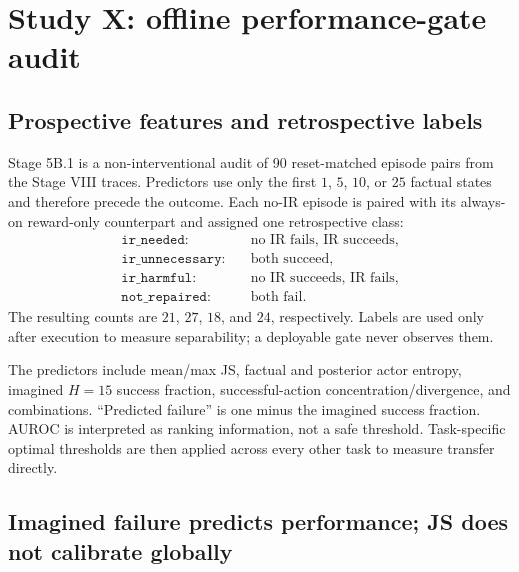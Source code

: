 \documentclass[10pt]{article}
\begin{document}
\section{Study X: offline performance-gate audit}

\subsection{Prospective features and retrospective labels}

Stage 5B.1 is a non-interventional audit of 90 reset-matched episode pairs from
the Stage VIII traces. Predictors use only the first $1$, $5$, $10$, or $25$
factual states and therefore precede the outcome. Each no-IR episode is paired
with its always-on reward-only counterpart and assigned one retrospective
class:
\begin{align*}
\texttt{ir\_needed}:&\quad \text{no IR fails, IR succeeds},\\
\texttt{ir\_unnecessary}:&\quad \text{both succeed},\\
\texttt{ir\_harmful}:&\quad \text{no IR succeeds, IR fails},\\
\texttt{not\_repaired}:&\quad \text{both fail}.
\end{align*}
The resulting counts are $21$, $27$, $18$, and $24$, respectively. Labels are
used only after execution to measure separability; a deployable gate never
observes them.

The predictors include mean/max JS, factual and posterior actor entropy,
imagined $H=15$ success fraction, successful-action concentration/divergence,
and combinations. ``Predicted failure'' is one minus the imagined success
fraction. AUROC is interpreted as ranking information, not a safe threshold.
Task-specific optimal thresholds are then applied across every other task to
measure transfer directly.

\subsection{Imagined failure predicts performance; JS does not calibrate globally}
\end{document}
